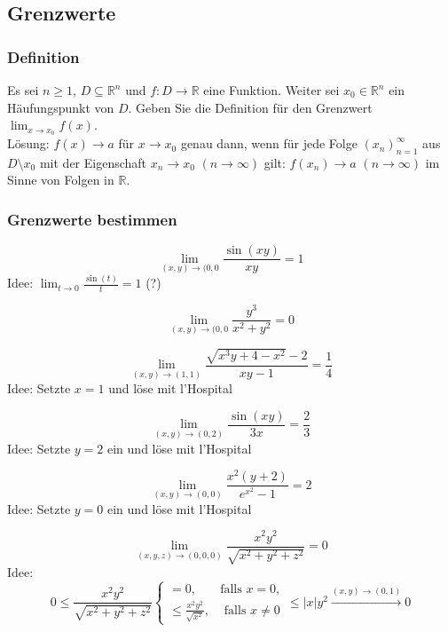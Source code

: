 \subsection{Grenzwerte}
\subsubsection{Definition}
Es sei $n \geq 1$, $D \subseteq \mathbb{R}^n$ und $f : D \to \mathbb{R}$ eine Funktion.
Weiter sei $x_0 \in \mathbb{R}^n$ ein Häufungspunkt von $D$.
Geben Sie die Definition für den Grenzwert $\lim_{x \to x_0} f(x)$.\\
Lösung:
$f(x) \to a$ für $x \to x_0$ genau dann, wenn für jede Folge $(x_n)_{n = 1}^{\infty}$ aus $D \setminus x_0$ mit der Eigenschaft $x_n \to x_0$ $(n \to \infty)$ gilt:
$f(x_n) \to a$ $(n \to \infty)$ im Sinne von Folgen in $\mathbb{R}$.

\subsubsection{Grenzwerte bestimmen}
\begin{displaymath}
  \lim_{(x,y) \to (0,0} \frac{\sin(xy)}{xy} = 1
\end{displaymath}
Idee: $\lim_{t \to 0} \frac{\sin(t)}{t} = 1$ (?)

\begin{displaymath}
  \lim_{(x,y) \to (0,0} \frac{y^3}{x^2 + y^2} = 0
\end{displaymath}

\begin{displaymath}
  \lim_{(x,y) \to (1,1)} \frac{\sqrt{x^3y + 4 - x^2} - 2}{xy - 1} = \frac{1}{4}
\end{displaymath}
Idee: Setzte $x = 1$ und löse mit l'Hospital

\begin{displaymath}
  \lim_{(x,y) \to (0,2)} \frac{\sin(xy)}{3x} = \frac{2}{3}
\end{displaymath}
Idee: Setzte $y = 2$ ein und löse mit l'Hospital

\begin{displaymath}
  \lim_{(x,y) \to (0,0)} \frac{x^2(y + 2)}{e^{x^2} - 1} = 2
\end{displaymath}
Idee: Setzte $y = 0$ ein und löse mit l'Hospital

\begin{displaymath}
  \lim_{(x,y,z) \to (0,0,0)} \frac{x^2 y^2}{\sqrt{x^2 + y^2 + z^2}} = 0
\end{displaymath}
Idee:
\begin{displaymath}
  0 \leq \frac{x^2 y^2}{\sqrt{x^2 + y^2 + z^2}}
  \begin{cases}
    = 0,& \text{falls } x = 0,\\
    \leq \frac{x^2 y^2}{\sqrt{x^2}},& \text{ falls } x \neq 0
  \end{cases}
  \leq |x|y^2 \xrightarrow{(x,y) \to (0,1)} 0
\end{displaymath}

